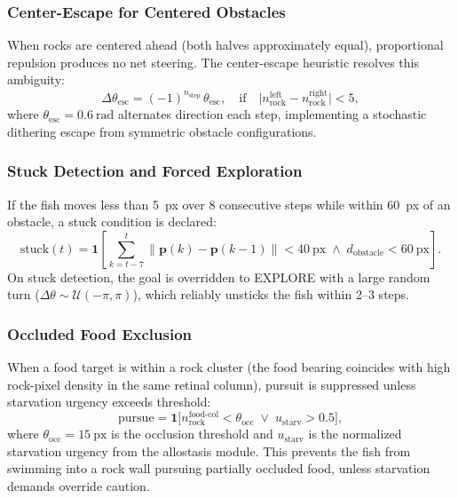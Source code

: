 \documentclass[11pt,a4paper]{article}
\begin{document}
\subsubsection{Center-Escape for Centered Obstacles}

When rocks are centered ahead (both halves approximately equal),
proportional repulsion produces no net steering.
The center-escape heuristic resolves this ambiguity:
\begin{equation}\label{eq:center_escape}
  \Delta\theta_\mathrm{esc} = (-1)^{n_\mathrm{step}}\,\theta_\mathrm{esc},
  \quad\text{if}\quad
  \bigl|n_\mathrm{rock}^\mathrm{left} - n_\mathrm{rock}^\mathrm{right}\bigr| < 5,
\end{equation}
where $\theta_\mathrm{esc} = 0.6~\text{rad}$ alternates direction
each step, implementing a stochastic dithering escape from symmetric
obstacle configurations.

\subsubsection{Stuck Detection and Forced Exploration}

If the fish moves less than 5~px over 8 consecutive steps while
within 60~px of an obstacle, a stuck condition is declared:
\begin{equation}\label{eq:stuck}
  \text{stuck}(t) = \mathbf{1}\!\left[
    \sum_{k=t-7}^{t} \|\mathbf{p}(k) - \mathbf{p}(k-1)\| < 40~\text{px}
    \;\land\; d_\mathrm{obstacle} < 60~\text{px}
  \right].
\end{equation}
On stuck detection, the goal is overridden to EXPLORE with a
large random turn ($\Delta\theta \sim \mathcal{U}(-\pi, \pi)$),
which reliably unsticks the fish within 2--3 steps.

\subsubsection{Occluded Food Exclusion}

When a food target is within a rock cluster (the food bearing coincides
with high rock-pixel density in the same retinal column), pursuit is
suppressed unless starvation urgency exceeds threshold:
\begin{equation}\label{eq:food_exclusion}
  \mathrm{pursue} = \mathbf{1}\!\bigl[
    n_\mathrm{rock}^\mathrm{food\text{-}col} < \theta_\mathrm{occ}
    \;\lor\; u_\mathrm{starv} > 0.5
  \bigr],
\end{equation}
where $\theta_\mathrm{occ} = 15~\text{px}$ is the occlusion threshold and
$u_\mathrm{starv}$ is the normalized starvation urgency from the
allostasis module.
This prevents the fish from swimming into a rock wall pursuing
partially occluded food, unless starvation demands override caution.
\end{document}
